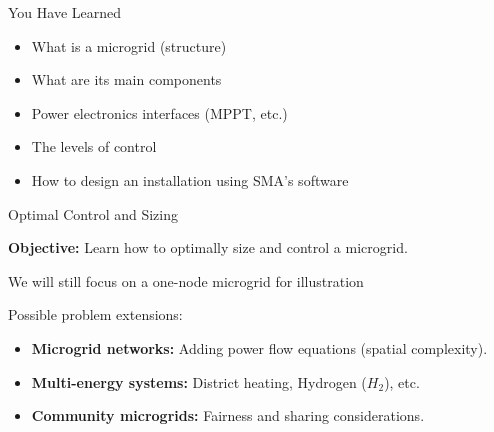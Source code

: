 
\titleframe


\begin{frame}{You Have Learned}
    \begin{itemize}
        \item What is a microgrid (structure)
        \item What are its main components
        \item Power electronics interfaces (MPPT, etc.)
        \item The levels of control
        \item How to design an installation using SMA’s software
    \end{itemize}
\end{frame}

\begin{frame}{Optimal Control and Sizing}

    \textbf{Objective:} Learn how to optimally size and control a microgrid.
    
    We will still focus on a one-node microgrid for illustration

    \vspace{0.3cm}
    Possible problem extensions:
    \begin{itemize}
        \item \textbf{Microgrid networks:} Adding power flow equations (spatial complexity).
        \item \textbf{Multi-energy systems:} District heating, Hydrogen ($H_2$), etc.
        \item \textbf{Community microgrids:} Fairness and sharing considerations.
    \end{itemize}
\end{frame}


